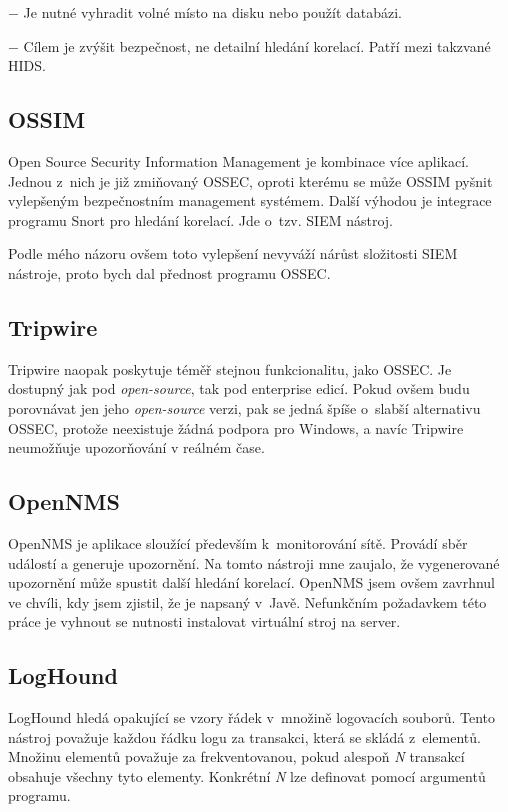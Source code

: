 \documentclass[thesis=B,czech]{FITthesis}[2012/06/26]
\begin{document}
$-$ Je nutné vyhradit volné místo na disku nebo použít databázi.
	
$-$ Cílem je zvýšit bezpečnost, ne detailní hledání korelací. Patří mezi takzvané HIDS.

\subsection{OSSIM}		
Open Source Security Information Management je kombinace více aplikací. Jednou z~nich je již zmiňovaný OSSEC, oproti kterému se může OSSIM pyšnit vylepšeným bezpečnostním management systémem. Další výhodou je integrace programu Snort pro hledání korelací. Jde o~tzv. SIEM nástroj. \cite{logManagement} 

Podle mého názoru ovšem toto vylepšení nevyváží nárůst složitosti SIEM nástroje, proto bych dal přednost programu OSSEC. 

\subsection{Tripwire}
Tripwire naopak poskytuje téměř stejnou funkcionalitu, jako OSSEC. Je dostupný jak pod \textit{open-source}, tak pod enterprise edicí. Pokud ovšem budu porovnávat jen jeho \textit{open-source} verzi, pak se jedná špíše o~slabší alternativu OSSEC, protože neexistuje žádná podpora pro Windows, a navíc Tripwire neumožňuje upozorňování v reálném čase. \cite{tripwireVsOssec}

\subsection{OpenNMS} 
OpenNMS je aplikace sloužící především k~monitorování sítě. Provádí sběr událostí a generuje upozornění. Na tomto nástroji mne zaujalo, že vygenerované upozornění může spustit další hledání korelací. OpenNMS jsem ovšem zavrhnul ve chvíli, kdy jsem zjistil, že je napsaný v~Javě. Nefunkčním požadavkem této práce je vyhnout se nutnosti instalovat virtuální stroj na server. \cite{openNMS}

\subsection{LogHound}
LogHound hledá opakující se vzory řádek v~množině logovacích souborů. \cite{logManagement} Tento nástroj považuje každou řádku logu za transakci, která se skládá z~elementů. Množinu elementů považuje za frekventovanou, pokud alespoň \textit{N} transakcí obsahuje všechny tyto elementy. Konkrétní \textit{N} lze definovat pomocí argumentů programu. \cite{loghound} 
\end{document}
